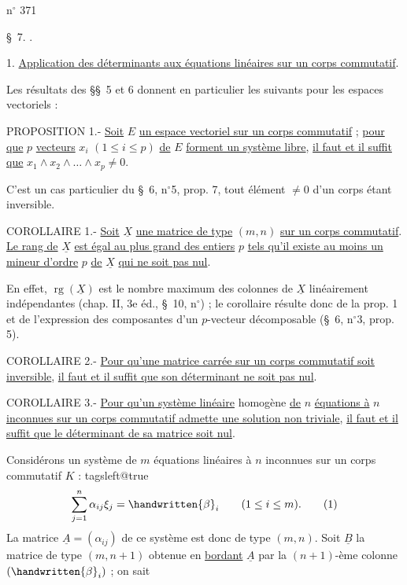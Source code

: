  \hfill n$^\circ$ 371

\S~7. .

1. \uline{Application des déterminants aux équations linéaires sur un corps commutatif}.

Les résultats des \S\S~5 et 6 donnent en particulier les suivants pour les espaces vectoriels :

PROPOSITION 1.- \uline{Soit} $E$ \uline{un espace vectoriel sur un corps commutatif} ; \uline{pour que} $p$ \uline{vecteurs} $x_i$ $(1\leq i\leq p)$ \uline{de} $E$ \uline{forment un système libre}, \uline{il faut et il suffit que} $x_1\wedge x_2\wedge\ldots\wedge x_p\ne0$.

C'est un cas particulier du \S~6, n$^\circ$5, prop. 7, tout élément $\ne0$ d'un corps étant inversible.

COROLLAIRE 1.- \uline{Soit} $\underline X$ \uline{une matrice de type} $(m,n)$ \uline{sur un corps commutatif}. \uline{Le rang de} $\underline X$ \uline{est égal au plus grand des entiers} $p$ \uline{tels qu'il existe au moins un mineur d'ordre} $p$ \uline{de} $\underline X$ \uline{qui ne soit pas nul}.

En effet, $\operatorname{rg}(\underline X)$ est le nombre maximum des colonnes de $\underline X$ linéairement indépendantes (chap. II, 3e éd., \S~10, n$^\circ$\quad) ; le corollaire résulte donc de la prop. 1 et de l'expression des composantes d'un $p$-vecteur décomposable (\S~6, n$^\circ$3, prop. 5).

COROLLAIRE 2.- \uline{Pour qu'une matrice carrée sur un corps commutatif soit inversible}, \uline{il faut et il suffit que son déterminant ne soit pas nul}.

COROLLAIRE 3.- \uline{Pour qu'un système linéaire} homogène \uline{de} $n$ \uline{équations à} $n$ \uline{inconnues sur un corps commutatif admette une solution non triviale}, \uline{il faut et il suffit que le déterminant de sa matrice soit nul}.

Considérons un système de $m$ équations linéaires à $n$ inconnues sur un corps commutatif $K$ :
{\csname tagsleft@true\endcsname
\[
 \sum_{j=1}^{n}\alpha_{ij}\xi_j=\handwritten{\beta}_i\qquad (1\leq i\leq m).\tag*{(1)}
\]
}
La matrice $\underline A=(\alpha_{ij})$ de ce système est donc de type $(m,n)$. Soit $\underline B$ la matrice de type $(m,n+1)$ obtenue en \uline{bordant} $\underline A$ par la $(n+1)$-ème colonne $(\handwritten{\beta}_i)$ ; on sait
